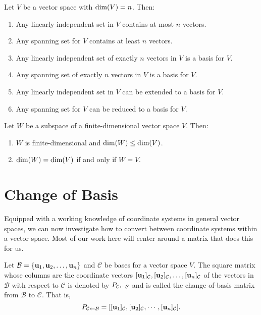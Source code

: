 \documentclass[../m073main.tex]{subfiles}
\begin{document}
\begin{theorem}
	Let $V$ be a vector space with $\textrm{dim}(V) = n$.
	Then:
	\begin{enumerate}[label=(\alph*)]
		\item Any linearly independent set in $V$ contains at most $n$ vectors.
		\item Any spanning set for $V$ contains at least $n$ vectors.
		\item Any linearly independent set of exactly $n$ vectors in $V$ is a basis for $V$.
		\item Any spanning set of exactly $n$ vectors in $V$ is a basis for $V$.
		\item Any linearly independent set in $V$ can be extended to a basis for $V$.
		\item Any spanning set for $V$ can be reduced to a basis for $V$.
	\end{enumerate}
\end{theorem}

\begin{theorem}
	Let $W$ be a subspace of a finite-dimensional vector space $V$.
	Then:
	\begin{enumerate}[label=(\alph*)]
		\item $W$ is finite-dimensional and $\textrm{dim}(W) \leq \textrm{dim}(V)$.
		\item $\textrm{dim}(W) = \textrm{dim}(V)$ if and only if $W = V$.
	\end{enumerate}
\end{theorem}

\section{Change of Basis}
Equipped with a working knowledge of coordinate systems in general vector spaces, we can now investigate how to convert between coordinate systems within a vector space.
Most of our work here will center around a matrix that does this for us.

\begin{definition}
	Let $\mathcal{B} = \{\mathbf{u}_1, \mathbf{u}_2, \ldots, \mathbf{u}_n\}$ and $\mathcal{C}$ be bases for a vector space $V$.
	The square matrix whose columns are the coordinate vectors $[\mathbf{u}_1]_{\mathcal{C}}, [\mathbf{u}_2]_{\mathcal{C}}, \ldots, [\mathbf{u}_n]_{\mathcal{C}}$ of the vectors in $\mathcal{B}$ with respect to $\mathcal{C}$ is denoted by $P_{\mathcal{C} \leftarrow \mathcal{B}}$ and is called the change-of-basis matrix from $\mathcal{B}$ to $\mathcal{C}$.
	That is,
	\[ P_{\mathcal{C} \leftarrow \mathcal{B}} = [[\mathbf{u}_1]_{\mathcal{C}}, [\mathbf{u}_2]_{\mathcal{C}}, \cdots, [\mathbf{u}_n]_{\mathcal{C}}]. \]
\end{definition}
\end{document}
